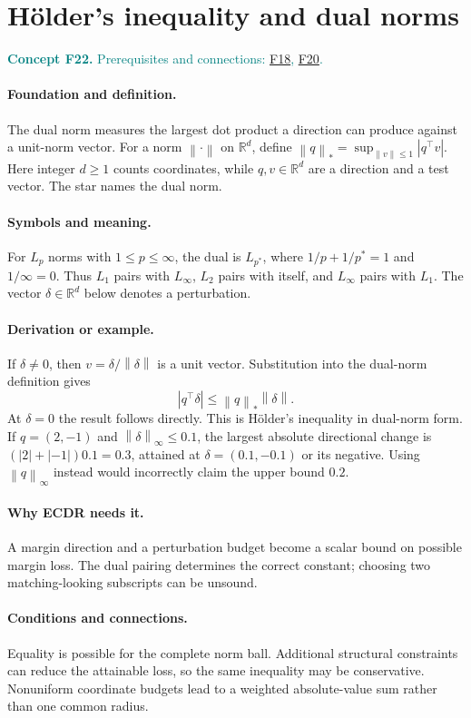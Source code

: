 \documentclass[11pt,a4paper]{article}
\newcommand{\R}{\mathbb R}
\newcommand{\norm}[1]{\left\lVert#1\right\rVert}
\newcommand{\conceptid}{Front matter}
\newcommand{\concept}[3]{\clearpage\renewcommand{\conceptid}{#1}%
\section{#2}\label{concept:#1}%
\textcolor{teal}{\textbf{Concept #1.} Prerequisites and connections: #3.}\par
\typeout{ECDR-CONCEPT-START #1 PAGE=\thepage}}
\begin{document}
\concept{F22}{H\"older's inequality and dual norms}{\hyperref[concept:F18]{F18}, \hyperref[concept:F20]{F20}}
\paragraph{Foundation and definition.}
The dual norm measures the largest dot product a direction can produce
against a unit-norm vector. For a norm $\norm{\cdot}$ on $\R^d$,
define $\norm{q}_*=\sup_{\norm{v}\le1}|q^\top v|$.
Here integer $d\ge1$ counts coordinates, while $q,v\in\R^d$ are
a direction and a test vector. The star names the dual norm.
\paragraph{Symbols and meaning.}
For $L_p$ norms with $1\le p\le\infty$, the dual is $L_{p^*}$,
where $1/p+1/p^*=1$ and $1/\infty=0$. Thus $L_1$ pairs with
$L_\infty$, $L_2$ pairs with itself, and $L_\infty$ pairs with $L_1$.
The vector $\delta\in\R^d$ below denotes a perturbation.
\paragraph{Derivation or example.}
If $\delta\ne0$, then $v=\delta/\norm{\delta}$ is a unit vector.
Substitution into the dual-norm definition gives
\[
 |q^\top\delta|\le\norm{q}_*\norm{\delta}.
\]
At $\delta=0$ the result follows directly. This is H\"older's
inequality in dual-norm form. If $q=(2,-1)$ and
$\norm{\delta}_\infty\le0.1$, the largest absolute directional
change is $(|2|+|-1|)0.1=0.3$, attained at
$\delta=(0.1,-0.1)$ or its negative. Using $\norm{q}_\infty$
instead would incorrectly claim the upper bound $0.2$.
\paragraph{Why ECDR needs it.}
A margin direction and a perturbation budget become a scalar bound on
possible margin loss. The dual pairing determines the correct constant;
choosing two matching-looking subscripts can be unsound.
\paragraph{Conditions and connections.}
Equality is possible for the complete norm ball. Additional structural
constraints can reduce the attainable loss, so the same inequality may
be conservative. Nonuniform coordinate budgets lead to a weighted
absolute-value sum rather than one common radius.
\par\label{endconcept:F22}
\end{document}
